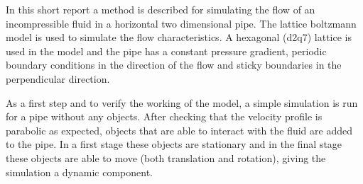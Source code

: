 In this short report a method is described for simulating the flow of an incompressible fluid in a horizontal two dimensional pipe. The lattice boltzmann model is used to simulate the flow characteristics. A hexagonal (d2q7) lattice is used in the model and the pipe has a constant pressure gradient, periodic boundary conditions in the direction of the flow and sticky boundaries in the perpendicular direction.

As a first step and to verify the working of the model, a simple simulation is run for a pipe without any objects. After checking that the velocity profile is parabolic as expected, objects that are able to interact with the fluid are added to the pipe. In a first stage these objects are stationary and in the final stage these objects are able to move (both translation and rotation), giving the simulation a dynamic component.